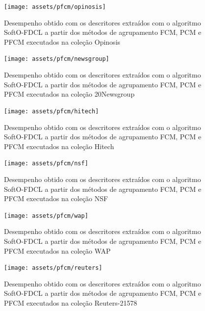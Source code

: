 \begin{figure}[!htp] \centering 
   \begin{minipage}{0.45\textwidth} 
     \centering
    \texttt{[image: assets/pfcm/opinosis]} 
    \caption{Desempenho obtido com os descritores extraídos com o algoritmo SoftO-FDCL a partir dos
      métodos de agrupamento FCM,
    PCM e PFCM executados na coleção Opinosis} 
  \label{fig:pfcmopinosis}
  \end{minipage}\hfill 
  \begin{minipage}{0.45\textwidth} \centering
    \texttt{[image: assets/pfcm/newsgroup]} 
    \caption{Desempenho obtido com os descritores extraídos com o algoritmo SoftO-FDCL a partir dos
      métodos de agrupamento FCM,
    PCM e PFCM executados na coleção 20Newsgroup} 
     \label{fig:pfcm20news} 
   \end{minipage} 
\end{figure}

\begin{figure}[!htp] \centering 
   \begin{minipage}{0.45\textwidth} 
     \centering
    \texttt{[image: assets/pfcm/hitech]} 
    \caption{Desempenho obtido com os descritores extraídos com o algoritmo SoftO-FDCL a partir dos
      métodos de agrupamento FCM,
    PCM e PFCM executados na coleção Hitech} 
  \label{fig:pfcmhitech}
  \end{minipage}\hfill 
  \begin{minipage}{0.45\textwidth} \centering
    \texttt{[image: assets/pfcm/nsf]} 
    \caption{Desempenho obtido com os descritores extraídos com o algoritmo SoftO-FDCL a partir dos
      métodos de agrupamento FCM,
    PCM e PFCM executados na coleção NSF} 
     \label{fig:pfcmnsf} 
   \end{minipage} 
\end{figure}

\begin{figure}[!htp] \centering 
   \begin{minipage}{0.45\textwidth} 
     \centering
    \texttt{[image: assets/pfcm/wap]} 
    \caption{Desempenho obtido com os descritores extraídos com o algoritmo SoftO-FDCL a partir dos
      métodos de agrupamento FCM,
    PCM e PFCM executados na coleção WAP} 
    \label{fig:pfcmwap}
  \end{minipage}\hfill 
  \begin{minipage}{0.45\textwidth} \centering
    \texttt{[image: assets/pfcm/reuters]} 
    \caption{Desempenho obtido com os descritores extraídos com o algoritmo SoftO-FDCL a partir dos
      métodos de agrupamento FCM,
    PCM e PFCM executados na coleção Reuters-21578} 
     \label{fig:pfcmreuters} 
   \end{minipage} 
\end{figure}


